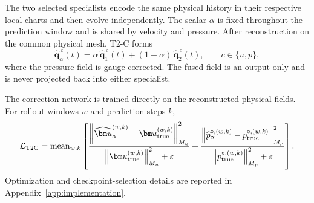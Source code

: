 The two selected specialists encode the same physical history in their
respective local charts and then evolve independently.
The scalar $\alpha$ is fixed throughout the prediction window and is shared
by velocity and pressure.
After reconstruction on the common physical mesh, T2-C forms
\begin{equation}
  \widehat{\bm q}_{\alpha}^{\,c}(t)
  =
  \alpha\,
  \widehat{\bm q}_{1}^{\,c}(t)
  +
  (1-\alpha)\,
  \widehat{\bm q}_{2}^{\,c}(t),
  \qquad
  c\in\{u,p\},
  \label{eq:app_t2c_field_fusion}
\end{equation}
where the pressure field is gauge corrected.
The fused field is an output only and is never projected back into either
specialist.

The correction network is trained directly on the reconstructed physical
fields. For rollout windows $w$ and prediction steps $k$,
\begin{equation}
  \mathcal L_{\rm T2C}
  =
  \operatorname{mean}_{w,k}
  \left[
    \frac{
      \left\|
        \widehat{\bm u}_{\alpha}^{(w,k)}
        -
        \bm u_{\rm true}^{(w,k)}
      \right\|_{M_u}^2
    }{
      \left\|
        \bm u_{\rm true}^{(w,k)}
      \right\|_{M_u}^2+\varepsilon
    }
    +
    \frac{
      \left\|
        \widehat p_{\alpha}^{\circ,(w,k)}
        -
        p_{\rm true}^{\circ,(w,k)}
      \right\|_{M_p}^2
    }{
      \left\|
        p_{\rm true}^{\circ,(w,k)}
      \right\|_{M_p}^2+\varepsilon
    }
  \right].
  \label{eq:app_t2c_loss}
\end{equation}
Optimization and checkpoint-selection details are reported in
Appendix~\ref{app:implementation}.
